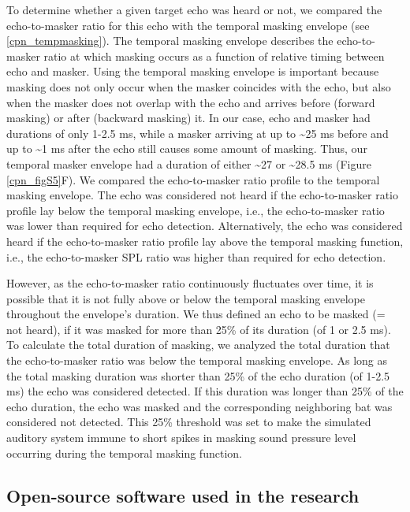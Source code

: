 \documentclass[
]{book}
\begin{document}
To determine whether a given target echo was heard or not, we compared the echo-to-masker ratio for this echo with the temporal masking envelope (see \ref{cpn_tempmasking}). The temporal masking envelope describes the echo-to-masker ratio at which masking occurs as a function of relative timing between echo and masker. Using the temporal masking envelope is important because masking does not only occur when the masker coincides with the echo, but also when the masker does not overlap with the echo and arrives before (forward masking) or after (backward masking) it. In our case, echo and masker had durations of only 1-2.5 ms, while a masker arriving at up to \textasciitilde25 ms before and up to \textasciitilde1 ms after the echo still causes some amount of masking. Thus, our temporal masker envelope had a duration of either \textasciitilde27 or \textasciitilde28.5 ms (Figure \ref{cpn_figS5}F). We compared the echo-to-masker ratio profile to the temporal masking envelope. The echo was considered not heard if the echo-to-masker ratio profile lay below the temporal masking envelope, i.e., the echo-to-masker ratio was lower than required for echo detection. Alternatively, the echo was considered heard if the echo-to-masker ratio profile lay above the temporal masking function, i.e., the echo-to-masker SPL ratio was higher than required for echo detection.

However, as the echo-to-masker ratio continuously fluctuates over time, it is possible that it is not fully above or below the temporal masking envelope throughout the envelope's duration. We thus defined an echo to be masked (= not heard), if it was masked for more than 25\% of its duration (of 1 or 2.5 ms). To calculate the total duration of masking, we analyzed the total duration that the echo-to-masker ratio was below the temporal masking envelope. As long as the total masking duration was shorter than 25\% of the echo duration (of 1-2.5 ms) the echo was considered detected. If this duration was longer than 25\% of the echo duration, the echo was masked and the corresponding neighboring bat was considered not detected. This 25\% threshold was set to make the simulated
auditory system immune to short spikes in masking sound pressure level occurring during the temporal masking function.

\hypertarget{open-source-software-used-in-the-research}{%
\subsection{Open-source software used in the research}\label{open-source-software-used-in-the-research}}
\end{document}
